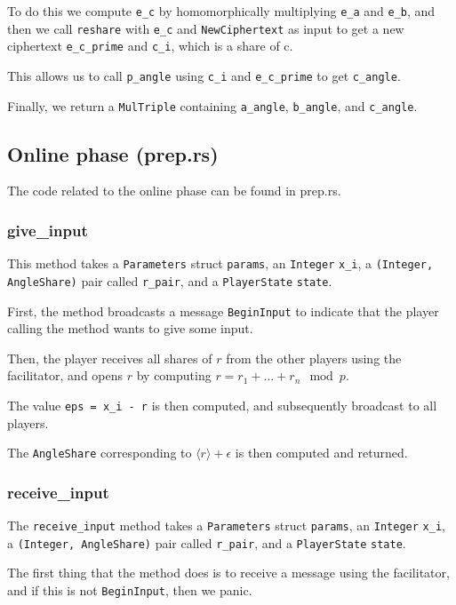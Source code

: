 \documentclass[../main.tex]{subfiles}
\begin{document}
To do this we compute \lstinline{e_c} by homomorphically multiplying \lstinline{e_a} and \lstinline{e_b}, and then we call \lstinline{reshare} with \lstinline{e_c} and \lstinline{NewCiphertext} as input to get a new ciphertext \lstinline{e_c_prime} and \lstinline{c_i}, which is a share of c.

This allows us to call \lstinline{p_angle} using \lstinline{c_i} and \lstinline{e_c_prime} to get \lstinline{c_angle}.

Finally, we return a \lstinline{MulTriple} containing \lstinline{a_angle}, \lstinline{b_angle}, and \lstinline{c_angle}.

\subsection{Online phase (prep.rs)}
The code related to the online phase can be found in prep.rs.

\subsubsection{give\_input}
This method takes a \lstinline{Parameters} struct \lstinline{params}, an \lstinline{Integer} \lstinline{x_i}, a \lstinline{(Integer, AngleShare)} pair called \lstinline{r_pair}, and a \lstinline{PlayerState} \lstinline{state}.

First, the method broadcasts a message \lstinline{BeginInput} to indicate that the player calling the method wants to give some input.

Then, the player receives all shares of $r$ from the other players using the facilitator, and opens $r$ by computing $r = r_1 + ... + r_n \mod p$.

The value \lstinline{eps = x_i - r} is then computed, and subsequently broadcast to all players.

The \lstinline{AngleShare} corresponding to $\langle r \rangle + \epsilon$ is then computed and returned.
\subsubsection{receive\_input}
The \lstinline{receive_input} method takes a \lstinline{Parameters} struct \lstinline{params}, an \lstinline{Integer} \lstinline{x_i}, a \lstinline{(Integer, AngleShare)} pair called \lstinline{r_pair}, and a \lstinline{PlayerState} \lstinline{state}.

The first thing that the method does is to receive a message using the facilitator, and if this is not \lstinline{BeginInput}, then we panic.
\end{document}
